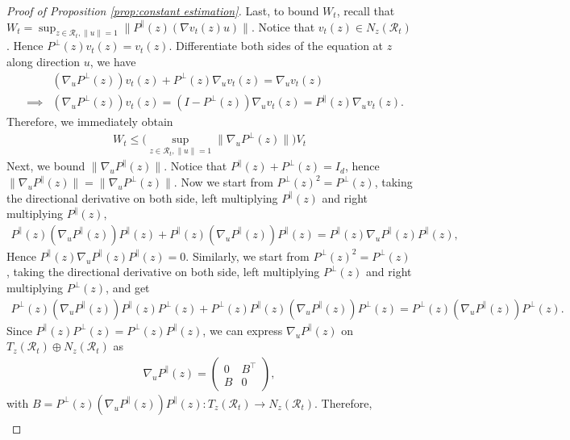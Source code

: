 \documentclass[11pt]{article}
\newcommand{\mc}{\mathcal}
\begin{document}
\begin{proof}[Proof of Proposition \ref{prop:constant estimation}]
\noindent Last, to bound $W_t$, recall that $W_t=\sup_{z\in \mc{R}_t, \| u \|=1} \| P^\parallel(z)(\nabla v_t(z)u) \|$. Notice that $v_t(z)\in N_z(\mc{R}_t)$. Hence $P^\perp(z)v_t(z)=v_t(z)$. Differentiate both sides of the equation at $z$ along direction $u$, we have
\begin{align*}
     &(\nabla_u P^\perp(z)) v_t(z) + P^\perp(z) \nabla_u v_t(z)  = \nabla_u v_t(z) \\
     \quad \implies  & (\nabla_u P^\perp(z)) v_t(z) = (I- P^\perp(z)) \nabla_u v_t(z) = P^\parallel(z) \nabla_u v_t(z).
\end{align*}
Therefore, we immediately obtain
\begin{align*}
    W_t \le \big( \sup_{z\in\mc{R}_t, \| u \|=1} \| \nabla_u P^\perp(z) \|\big) V_t
\end{align*}
Next, we bound $\|\nabla_u P^\parallel(z)\|$. Notice that $P^\parallel(z)+P^\perp(z)=I_d$, hence $\|\nabla_u P^\parallel(z)\|=\|\nabla_u P^\perp(z)\|$. Now we start from $P^\perp(z)^2=P^\perp(z)$, taking the directional derivative on both side, left multiplying $P^\parallel(z)$ and right multiplying $P^\parallel(z)$,
\begin{align*}
    P^\parallel(z)(\nabla_u P^\parallel(z))P^\parallel(z) + P^\parallel(z)(\nabla_u P^\parallel(z))P^\parallel(z) = P^\parallel(z)\nabla_u P^\parallel(z) P^\parallel(z),
\end{align*}
Hence $P^\parallel(z)\nabla_u P^\parallel(z) P^\parallel(z) =0$. Similarly, we start from $P^\perp(z)^2=P^\perp(z)$, taking the directional derivative on both side, left multiplying $P^\perp(z)$ and right multiplying $P^\perp(z)$, and get
\begin{align*}
    P^\perp(z) (\nabla_u P^\parallel(z))P^\parallel(z)P^\perp(z) + P^\perp(z)P^\parallel(z) (\nabla_u P^\parallel(z))P^\perp(z) = P^\perp(z)(\nabla_u P^\parallel(z))P^\perp(z).
\end{align*}
Since $P^\parallel(z)P^\perp(z)=P^\perp(z)P^\parallel(z)$, we can express $\nabla_u P^\parallel(z)$ on $T_z(\mc{R}_t)\oplus N_z(\mc{R}_t)$ as
\begin{align*}
    \nabla_u P^\parallel(z) = \begin{pmatrix}
        0 & B^\intercal \\
        B & 0
    \end{pmatrix},
\end{align*}
with $B=P^\perp(z)(\nabla_u P^\parallel(z))P^\parallel(z): T_z(\mc{R}_t)\to N_z(\mc{R}_t)$. Therefore,
\begin{align*}

\end{align*}
\end{proof}
\end{document}
